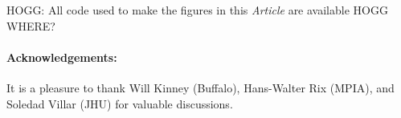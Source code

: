 \documentclass[letterpaper]{article}
\newcommand{\documentname}{\textsl{Article}}
\begin{document}
HOGG: All code used to make the figures in this \documentname{} are available HOGG WHERE?

\paragraph{Acknowledgements:}
It is a pleasure to thank Will Kinney (Buffalo), Hans-Walter Rix (MPIA), and Soledad Villar (JHU) for valuable discussions.



\end{document}

